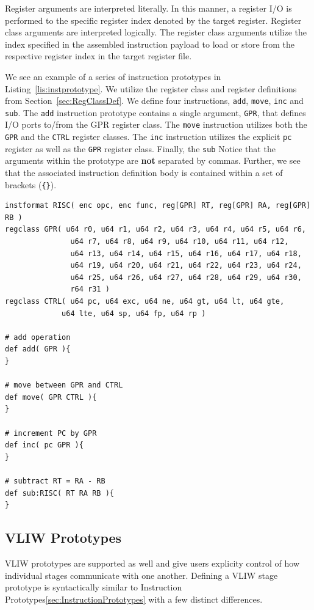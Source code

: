 \documentclass{article}
\begin{document}
Register arguments are interpreted literally.  In this manner, a register I/O is performed to the specific 
register index denoted by the target register.  Register class arguments are interpreted logically.  The register 
class arguments utilize the index specified in the assembled instruction payload to load or store from the respective 
register index in the target register file.  

We see an example of a series of instruction prototypes in Listing~\ref{lis:instprototype}.  We utilize the register class 
and register definitions from Section~\ref{sec:RegClassDef}.  We define four instructions, \texttt{add}, \texttt{move}, 
\texttt{inc} and \texttt{sub}.  The \texttt{add} instruction prototype contains a single argument, \texttt{GPR}, that defines I/O ports 
to/from the GPR register class.  The \texttt{move} instruction utilizes both the \texttt{GPR} and the \texttt{CTRL} 
register classes.  The \texttt{inc} instruction utilizes the explicit \texttt{pc} register as well as the \texttt{GPR} 
register class.  Finally, the \texttt{sub} Notice that the arguments within the prototype are \textbf{not} separated by commas.  Further, we see 
that the associated instruction definition body is contained within a set of brackets (\texttt{\{\}}).  

\clearpage
\vspace{0.125in}
\begin{lstlisting}[frame=single,style=base,caption={Instruction Prototype Format},captionpos=b,label={lis:instprototype}]
instformat RISC( enc opc, enc func, reg[GPR] RT, reg[GPR] RA, reg[GPR] RB )
regclass GPR( u64 r0, u64 r1, u64 r2, u64 r3, u64 r4, u64 r5, u64 r6, 
		       u64 r7, u64 r8, u64 r9, u64 r10, u64 r11, u64 r12, 
		       u64 r13, u64 r14, u64 r15, u64 r16, u64 r17, u64 r18,
		       u64 r19, u64 r20, u64 r21, u64 r22, u64 r23, u64 r24, 
		       u64 r25, u64 r26, u64 r27, u64 r28, u64 r29, u64 r30,
		       r64 r31 )
regclass CTRL( u64 pc, u64 exc, u64 ne, u64 gt, u64 lt, u64 gte,
			 u64 lte, u64 sp, u64 fp, u64 rp )

# add operation			 
def add( GPR ){
}

# move between GPR and CTRL 
def move( GPR CTRL ){
}

# increment PC by GPR
def inc( pc GPR ){
}

# subtract RT = RA - RB
def sub:RISC( RT RA RB ){
}
\end{lstlisting}

\clearpage

\subsection{VLIW Prototypes}
\label{sec:VLIWPrototypes}
VLIW prototypes are supported as well and give users explicity control of how individual stages communicate with one another. 
Defining a VLIW stage prototype is syntactically similar to Instruction Prototypes\ref{sec:InstructionPrototypes} with a few distinct differences.
\end{document}
